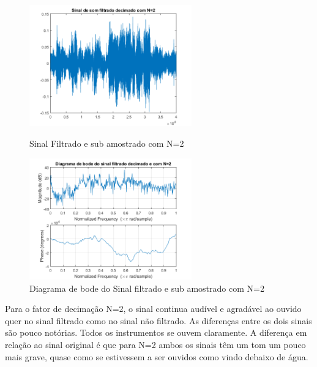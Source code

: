 \documentclass[11pt]{article}
\begin{document}
\newpage
\begin{figure}[h]
\begin{center}
\begin{minipage}[b]{0.45\linewidth}
\includegraphics[width=7cm]{fds2.png}
\caption{Sinal Filtrado e sub amostrado com N=2}
\label{figura11}
\end{minipage}
\begin{minipage}[b]{0.45\linewidth}
\includegraphics[width=7cm]{fdb2.png}
\caption{Diagrama de bode do Sinal filtrado e sub amostrado com N=2}
\label{figura12}
\end{minipage}
\end{center}
\end{figure}
Para o fator de decimação N=2, o sinal continua audível e agradável ao ouvido quer no sinal filtrado como no sinal não filtrado. As diferenças entre os dois sinais são pouco notórias. Todos os instrumentos se ouvem claramente. A diferença em relação ao sinal original é que para N=2 ambos os sinais têm um tom um pouco mais grave, quase como se estivessem a ser ouvidos como vindo debaixo de água.
\newpage
\end{document}
